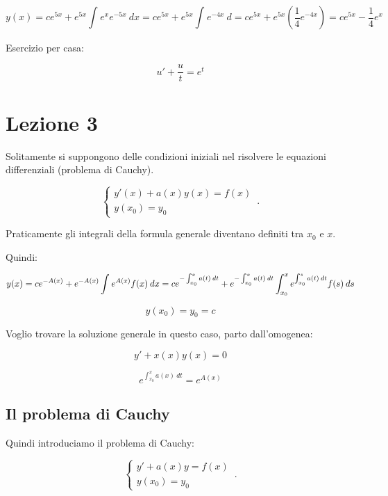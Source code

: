 \documentclass[11pt]{article}
\begin{document}
\[
    y(x) = c e ^{5x} + e ^{5x} \int_{{}}^{{}} {e^x e ^{-5x}} \: d{x} {} = c e ^{5x} + e ^{5x} \int_{{}}^{{}} {e ^{-4x}} \: d{} {} = c e ^{5x} + e ^{5x} (\frac{1}{4} e ^{-4x}) = c e ^{5x} - \frac{1}{4} e ^{x}
\]

Esercizio per casa:

\[
    u' + \frac{u}{t} = e ^{t}
\]

\newpage

\section{Lezione 3}

Solitamente si suppongono delle condizioni iniziali nel risolvere le equazioni differenziali (problema di Cauchy).

\begin{equation}
    \begin{cases}
      y'(x)+a(x)y(x)=f(x)\\
      y(x_0)=y_0
    \end{cases}\,.
\end{equation}

Praticamente gli integrali della formula generale diventano definiti tra $x_0$ e $x$.

Quindi:

\[
    y(x) = ce ^{-A(x)}+ e ^{-A(x)} \int_{{}}^{{}} {e ^{A(x)}f(x)} \: d{x} {} = c e ^{-\int_{{x_0}}^{{x}} {a(t)} \: d{t} {}}+e ^{- \int_{{x_0}}^{{x}} {a(t)} \: d{t} {}}\int_{{x_0}}^{{x}} {e ^{\int_{{x_0}}^{{s}} {a(t)} \: d{t} {}}f(s)} \: d{s} {}\\
\]

\[
    y(x_0)=y_0=c
\]


Voglio trovare la soluzione generale in questo caso, parto dall'omogenea:

\[
    y'+x(x)y(x) = 0
\]

\[
    e ^{\int_{{x_0}}^{{x}} {a(x)} \: d{t} {}} = e ^{A(x)}
\]


\subsection{Il problema di Cauchy}

Quindi introduciamo il problema di Cauchy:

\begin{equation}
    \begin{cases}
      y'+a(x)y = f(x)\\
      y(x_0) = y_0
    \end{cases}\,.
\end{equation}
\end{document}
